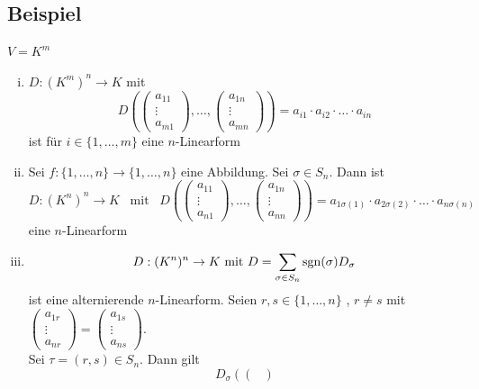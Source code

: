 \subsection{Beispiel} %
\label{sub:beispiel}
$V=K^m$
\begin{enumerate}[(i)]
	\item $D : (K^m)^n \to K$ mit 
	\[
		D \left(\begin{pmatrix}
			a_{11} \\ \vdots \\ a_{m1}
		\end{pmatrix} , \ldots , \begin{pmatrix}
			a_{1n} \\ \vdots \\ a_{mn}
		\end{pmatrix} \right) = a_{i1} \cdot a_{i2} \cdot \ldots \cdot a_{in}
	\]
	ist für $i \in \{ 1, \ldots , m\}$ eine $n$-Linearform
	\item Sei $f : \{1, \ldots , n \} \to \{ 1, \ldots , n \}$ eine Abbildung. Sei $\sigma \in S_n$. Dann ist 
	\[
		D : (K^n)^n \to K \enspace \text{ mit } \enspace D \left( \begin{pmatrix}
			a_{11} \\ \vdots \\ a_{n1}
		\end{pmatrix}, \ldots , \begin{pmatrix}
			a_{1n} \\ \vdots \\ a_{nn}
		\end{pmatrix} \right) = a_{1 \sigma(1)} \cdot a_{2 \sigma(2)} \cdot \ldots \cdot a_{n \sigma(n)}
	\]
	eine $n$-Linearform
	\item \[
		D : (K^n)^n \to K \text{ mit } D= \sum\limits_{\sigma \in S_n } \operatorname{sgn}(\sigma) D_{\sigma}
	\]
	ist eine alternierende $n$-Linearform. Seien $r,s \in \{ 1, \ldots ,n \}$ , $ r \not= s$ mit $\begin{pmatrix}
		a_{1r} \\ \vdots \\ a_{nr}
	\end{pmatrix} = \begin{pmatrix}
		a_{1s} \\ \vdots \\ a_{ns}
	\end{pmatrix}$.
	\vspace{10pt} \\
	Sei $ \tau = (r,s) \in S_n$. Dann gilt
	\[
		D_\sigma \left( \begin{pmatrix}

\end{pmatrix}\]
\end{enumerate}
